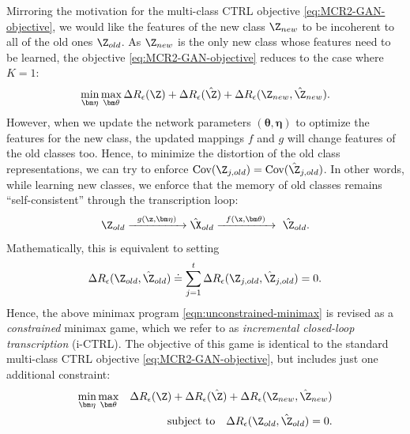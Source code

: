 \documentclass[../../book-main.tex]{subfiles}
\begin{document}
Mirroring the motivation for the multi-class CTRL objective
\eqref{eq:MCR2-GAN-objective}, we would like the features of the new
class $\Z_{new}$ to be incoherent to all of the old ones $\Z_{old}$.
As $\Z_{new}$ is the only new class whose features need to be
learned, the objective \eqref{eq:MCR2-GAN-objective} reduces to the
case where $K=1$:
\begin{equation}
    \min_{\bm \eta} \max_{\bm \theta} \Delta{R_\epsilon(\Z)} +
    \Delta{R_\epsilon(\hat{\Z})}+\Delta{R_\epsilon(\Z_{new},\hat{\Z}_{new})}.
    \label{eqn:unconstrained-minimax}
\end{equation}
However, when we update the network parameters $(\bm \theta,\bm
\eta)$ to optimize the features for the new class, the updated
mappings $f$ and $g$ will change features of the old classes too.
Hence, to minimize the distortion of the old class representations,
we can try to enforce $\mbox{Cov}(\Z_{j,old}) =
\mbox{Cov}(\hat{\Z}_{j,old})$. In other words, while learning new
classes, we enforce that the memory of old classes remains
``self-consistent'' through the transcription loop:
\begin{equation}
    \Z_{old} \xrightarrow{\hspace{2mm} g(\z,\bm \eta) \hspace{2mm}}
    \hat \X_{old} \xrightarrow{\hspace{2mm} f(\x, \bm
    \theta)\hspace{2mm}} \ \hat \Z_{old}.
\end{equation}
Mathematically, this is equivalent to setting
$$\Delta R_\epsilon(\Z_{old},\hat{\Z}_{old}) \doteq  \sum_{j=1}^t
\Delta R_\epsilon(\Z_{j,old},\hat{\Z}_{j,old}) = 0.$$
Hence, the above minimax program \eqref{eqn:unconstrained-minimax} is
revised as a {\em constrained} minimax game, which we refer to as
{\em incremental closed-loop transcription} (i-CTRL).
The objective of this game is identical to the standard multi-class
CTRL objective \eqref{eq:MCR2-GAN-objective}, but includes just one
additional constraint:
\begin{eqnarray}
    \min_{\bm \eta} \max_{\bm \theta}
    &&\Delta{R_\epsilon(\Z)}+\Delta{R_\epsilon(\hat{\Z})}+\Delta{R_\epsilon(\Z_{new},\hat{\Z}_{new})}
    \nonumber\\
    && \mbox{subject to} \quad  \Delta R_\epsilon(\Z_{old},\hat{\Z}_{old}) = 0.
    \label{eqn:constrained-minimax}
\end{eqnarray}
\end{document}
